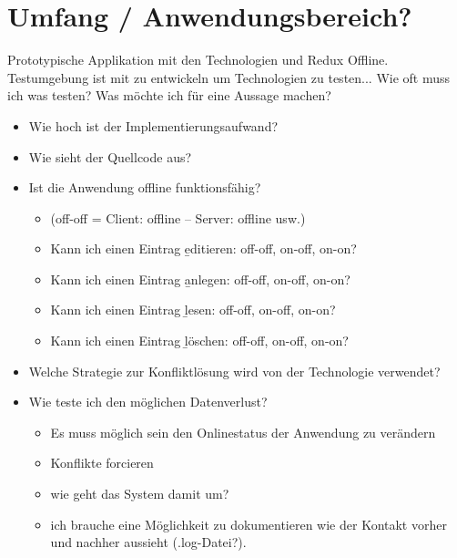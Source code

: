 %
%
\section{Umfang / Anwendungsbereich?}
Prototypische Applikation mit den Technologien  und Redux Offline. \\
Testumgebung ist mit zu entwickeln um Technologien zu testen...  Wie oft muss ich was testen? Was möchte ich für eine Aussage machen?
\begin{itemize}
  \item Wie hoch ist der Implementierungsaufwand?
  \item Wie sieht der Quellcode aus?
  \item Ist die Anwendung offline funktionsfähig?
  \begin{itemize}
    \item (off-off = Client: offline -- Server: offline usw.)
    \item Kann ich einen Eintrag \b{editieren}: off-off, on-off, on-on?
    \item Kann ich einen Eintrag \b{anlegen:} off-off, on-off, on-on?
    \item Kann ich einen Eintrag \b{lesen}: off-off, on-off, on-on?
    \item Kann ich einen Eintrag \b{löschen}: off-off, on-off, on-on?
  \end{itemize}
  \item Welche Strategie zur Konfliktlösung wird von der Technologie verwendet?
  \item Wie teste ich den möglichen Datenverlust?
  \begin{itemize}
    \item Es muss möglich sein den Onlinestatus der Anwendung zu verändern 
    \item Konflikte forcieren
    \item wie geht das System damit um?
    \item ich brauche eine Möglichkeit zu dokumentieren wie der Kontakt vorher und nachher aussieht (.log-Datei?).
  \end{itemize}
\end{itemize}
%
%
